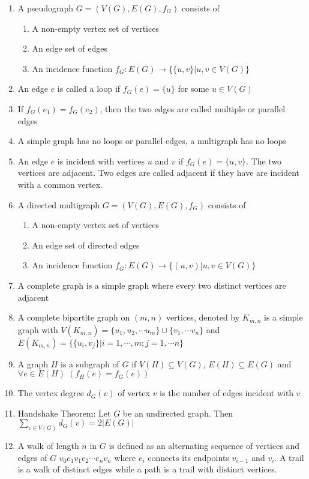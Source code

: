 \documentclass[11pt, twocolumn]{article}
\theoremstyle{definition} \newtheorem*{solution}{Solution}
\begin{document}
\begin{enumerate}
\begin{enumerate}
\item A pseudograph $G = (V(G), E(G), f_G)$ consists of 
\begin{enumerate}
\item A non-empty vertex set of vertices
\item An edge set of edges
\item An incidence function $f_G: E(G) \rightarrow \{\{u, v\}|u, v\in V(G)\}$
\end{enumerate}
\item An edge $e$ is called a loop if $f_G(e) = \{u\}$ for some $u\in V(G)$
\item If $f_G(e_1) = f_G(e_2)$, then the two edges are called multiple or parallel edges
\item A simple graph has no loops or parallel edges, a multigraph has no loops
\item An edge $e$ is incident with vertices $u$ and $v$ if $f_G(e) = \{ u, v \}$. The two vertices are adjacent. Two edges are called adjacent if they have are incident with a common vertex.
\item A directed multigraph $G = (V(G), E(G), f_G)$ consists of 
\begin{enumerate}
\item A non-empty vertex set of vertices
\item An edge set of directed edges
\item An incidence function $f_G: E(G) \rightarrow \{(u, v)|u, v\in V(G)\}$
\end{enumerate}
\item A complete graph is a simple graph where every two distinct vertices are adjacent
\item A complete bipartite graph on $(m, n)$ vertices, denoted by $K_{m,n}$ is a simple graph with $V(K_{m, n}) = \{u_1, u_2, \cdots u_m\} \cup \{v_1, \cdots v_n\}$ and $E(K_{m, n}) = \{\{u_i, v_j\}|i=1, \cdots, m; j = 1, \cdots n\}$
\item A graph $H$ is a subgraph of $G$ if $V(H)\subseteq V(G)$, $E(H) \subseteq E(G)$ and $\forall e\in E(H)\; (f_H(e) = f_G(e))$
\item The vertex degree $d_G(v)$ of vertex $v$ is the number of edges incident with $v$
\item Handshake Theorem: Let $G$ be an undirected graph. Then $\sum_{v\in V(G)} d_G(v) = 2|E(G)|$
\item A walk of length $n$ in $G$ is defined as an alternating sequence of vertices and edges of $G$ $v_0e_1v_1e_2\cdots e_n v_n$ where $e_i$ connects its endpoints $v_{i-1}$ and $v_{i}$. A trail is a walk of distinct edges while a path is a trail with distinct vertices.

\end{enumerate}
\end{enumerate}
\end{document}

